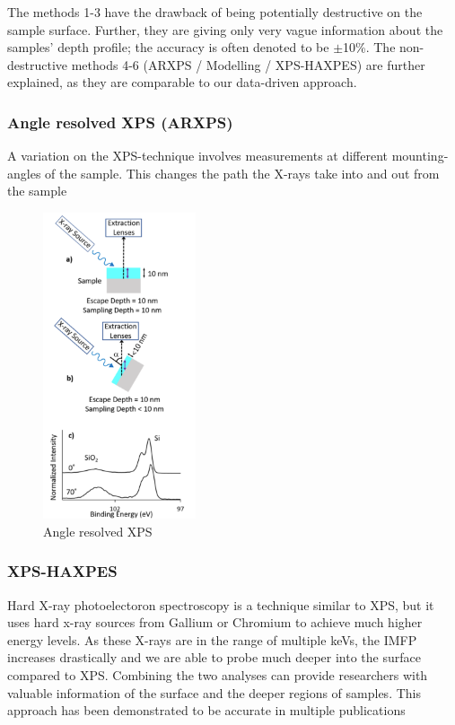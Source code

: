 The methods 1-3 have the drawback of being potentially destructive on the sample surface. Further, they are giving only very vague information about the samples’ depth profile; the accuracy is often denoted to be $\pm$10\%.
The non-destructive methods 4-6 (ARXPS / Modelling / XPS-HAXPES) are further explained, as they are comparable to our data-driven approach.

\subsubsection{Angle resolved XPS (ARXPS)}

A variation on the XPS-technique involves measurements at different mounting-angles of the sample.
This changes the path the X-rays take into and out from the sample 

\begin{figure}
    \centering
    \includegraphics[width=0.4\textwidth]{Figures/ARXPS.png}
    \caption{Angle resolved XPS \cite{stevie_introduction_2020}}
    \label{fig:enter-label}
\end{figure}


\subsubsection{XPS-HAXPES}

Hard X-ray photoelectoron spectroscopy is a technique similar to XPS, but it uses hard x-ray sources from Gallium or Chromium to achieve much higher energy levels. As these X-rays are in the range of multiple keVs, the IMFP increases drastically and we are able to probe much deeper into the surface compared to XPS. Combining the two analyses can provide researchers with valuable information of the surface and the deeper regions of samples. This approach has been demonstrated to be accurate in multiple publications \cite{bure_assessing_2023, siol_concepts_2020} 
